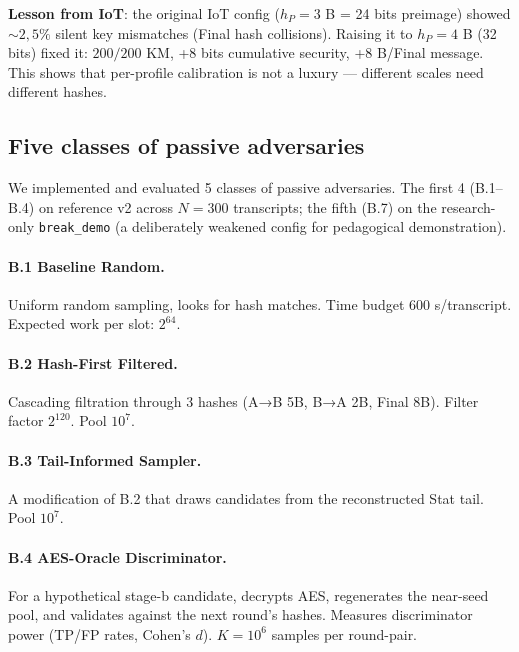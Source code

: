 \documentclass[11pt,a4paper]{article}
\begin{document}
\textbf{Lesson from IoT}: the original IoT config ($h_P = 3$ B = 24 bits preimage) showed $\sim 2{,}5\%$ silent key mismatches (Final hash collisions). Raising it to $h_P = 4$ B (32 bits) fixed it: $200/200$ KM, +8 bits cumulative security, +8 B/Final message. This shows that per-profile calibration is not a luxury --- different scales need different hashes.

\subsection{Five classes of passive adversaries}\label{pop:exp-attackers}

We implemented and evaluated 5 classes of passive adversaries. The first 4 (B.1--B.4) on reference v2 across $N = 300$ transcripts; the fifth (B.7) on the research-only \texttt{break\_demo} (a deliberately weakened config for pedagogical demonstration).

\paragraph{B.1 Baseline Random.} Uniform random sampling, looks for hash matches. Time budget 600 s/transcript. Expected work per slot: $2^{64}$.

\paragraph{B.2 Hash-First Filtered.} Cascading filtration through 3 hashes (A→B 5B, B→A 2B, Final 8B). Filter factor $2^{120}$. Pool $10^7$.

\paragraph{B.3 Tail-Informed Sampler.} A modification of B.2 that draws candidates from the reconstructed Stat tail. Pool $10^7$.

\paragraph{B.4 AES-Oracle Discriminator.} For a hypothetical stage-b candidate, decrypts AES, regenerates the near-seed pool, and validates against the next round's hashes. Measures discriminator power (TP/FP rates, Cohen's $d$). $K = 10^6$ samples per round-pair.
\end{document}
